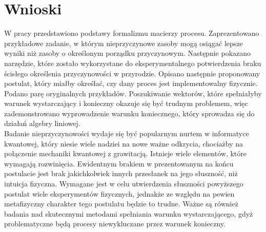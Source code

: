 \documentclass[10pt]{article} %
\begin{document}
\section{Wnioski}
W pracy przedstawiono podstawy formalizmu macierzy procesu. Zaprezentowano przykładowe zadanie, w którym nieprzyczynowe zasoby mogą osiągać lepsze wyniki niż zasoby o określonym porządku przyczynowym. Następnie pokazano narzędzie, które zostało wykorzystane do eksperymentalnego potwierdzenia
braku ścisłego określenia przyczynowości w przyrodzie. Opisano następnie proponowany postulat, który miałby określać, czy dany proces jest implementowalny fizycznie. Podano parę oryginalnych przykładów. Poszukiwanie wektorów, które spełniałyby warunek wystarczający i konieczny okazuje się być trudnym problemem, więc zademonstrowano wyprowadzenie 
warunku koniecznego, który sprowadza się do działań algebry liniowej.\\
Badanie nieprzyczynowości wydaje się być popularnym nurtem w informatyce kwantowej, który niesie wiele nadziei na nowe ważne odkrycia, chociażby na połączenie mechaniki kwantowej z grawitacją. Istnieje wiele elementów, które wymagają rozwinięcia.
Ewidentnym brakiem w prezentowanym na końcu postulacie jest brak jakichkolwiek innych przesłanek na jego słuszność, niż intuicja fizyczna. Wymagane jest w celu utwierdzenia słuszności powyższego postulat wiele eksperymentów fizycznych, jednakże ze względu na pewien metafizyczny charakter tego postulatu będzie to trudne.
Ważne są również badania nad skutecznymi metodami spełniania warunku wystarczającego, gdyż problematyczne będą procesy niewykluczane przez warunek konieczny. 
\end{document}
